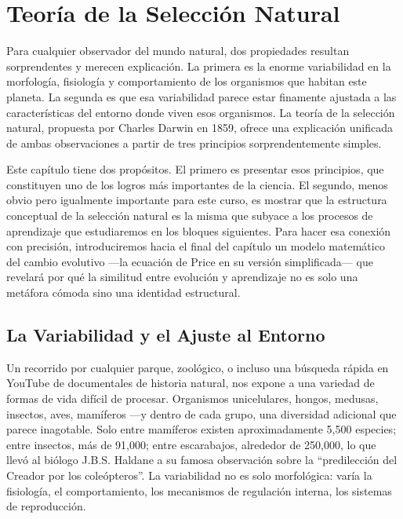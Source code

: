 \documentclass[
  letterpaper,
  DIV=11,
  numbers=noendperiod]{scrreprt}
\begin{document}
\chapter{Teoría de la Selección
Natural}\label{teoruxeda-de-la-selecciuxf3n-natural}

Para cualquier observador del mundo natural, dos propiedades resultan
sorprendentes y merecen explicación. La primera es la enorme
variabilidad en la morfología, fisiología y comportamiento de los
organismos que habitan este planeta. La segunda es que esa variabilidad
parece estar finamente ajustada a las características del entorno donde
viven esos organismos. La teoría de la selección natural, propuesta por
Charles Darwin en 1859, ofrece una explicación unificada de ambas
observaciones a partir de tres principios sorprendentemente simples.

Este capítulo tiene dos propósitos. El primero es presentar esos
principios, que constituyen uno de los logros más importantes de la
ciencia. El segundo, menos obvio pero igualmente importante para este
curso, es mostrar que la estructura conceptual de la selección natural
es la misma que subyace a los procesos de aprendizaje que estudiaremos
en los bloques siguientes. Para hacer esa conexión con precisión,
introduciremos hacia el final del capítulo un modelo matemático del
cambio evolutivo ---la ecuación de Price en su versión simplificada---
que revelará por qué la similitud entre evolución y aprendizaje no es
solo una metáfora cómoda sino una identidad estructural.

\section{La Variabilidad y el Ajuste al
Entorno}\label{la-variabilidad-y-el-ajuste-al-entorno}

Un recorrido por cualquier parque, zoológico, o incluso una búsqueda
rápida en YouTube de documentales de historia natural, nos expone a una
variedad de formas de vida difícil de procesar. Organismos unicelulares,
hongos, medusas, insectos, aves, mamíferos ---y dentro de cada grupo,
una diversidad adicional que parece inagotable. Solo entre mamíferos
existen aproximadamente 5,500 especies; entre insectos, más de 91,000;
entre escarabajos, alrededor de 250,000, lo que llevó al biólogo J.B.S.
Haldane a su famosa observación sobre la ``predilección del Creador por
los coleópteros''. La variabilidad no es solo morfológica: varía la
fisiología, el comportamiento, los mecanismos de regulación interna, los
sistemas de reproducción.
\end{document}
